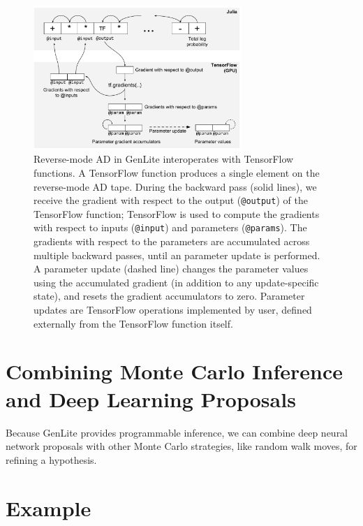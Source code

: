 \documentclass{article}
\begin{document}
\begin{figure}[h]
\centering
    \includegraphics[width=0.7\textwidth]{images/tf-integration-schematic.pdf}
    \caption{
Reverse-mode AD in GenLite interoperates with TensorFlow functions.
A TensorFlow function produces a single element on the reverse-mode AD tape.
During the backward pass (solid lines), we receive the gradient with respect to the output (\texttt{@output}) of the TensorFlow function; TensorFlow is used to compute the gradients with respect to inputs (\texttt{@input}) and parameters (\texttt{@params}).
The gradients with respect to the parameters are accumulated across multiple backward passes, until an parameter update is performed.
A parameter update (dashed line) changes the parameter values using the accumulated gradient (in addition to any update-specific state), and resets the gradient accumulators to zero.
Parameter updates are TensorFlow operations implemented by user, defined externally from the TensorFlow function itself.
}
    \label{fig:tf-integration-schematic}
\end{figure}

\section{Combining Monte Carlo Inference and Deep Learning Proposals}
Because GenLite provides programmable inference, we can combine deep neural network proposals with other Monte Carlo strategies, like random walk moves, for refining a hypothesis.





\section{Example}
\end{document}
